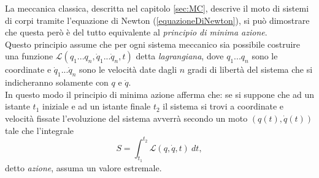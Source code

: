 La meccanica classica, descritta nel capitolo \ref{sec:MC}, descrive il moto di sistemi di corpi tramite l'equazione di Newton (\ref{equazioneDiNewton}), si può dimostrare che questa però è del tutto equivalente al \emph{principio di minima azione}.\\ Questo principio assume che per ogni sistema meccanico sia possibile costruire una funzione $\mathcal{L}(q_1...q_n,\dot{q}_1...\dot{q}_n,t)$ detta \emph{lagrangiana}, dove $q_1...q_n$ sono le coordinate e $\dot{q}_1...\dot{q}_n$ sono le velocità date dagli $n$ gradi di libertà del sistema che si indicheranno solamente con $q$ e $\dot{q}$.\\ In questo modo il principio di minima azione afferma che: se si suppone che ad un istante $t_1$ iniziale e ad un istante finale $t_2$ il sistema si trovi a coordinate e velocità fissate l'evoluzione del sistema avverrà secondo un moto $(q(t),\dot{q}(t))$ tale che l'integrale 
\begin{equation}
    \label{Azione}
    S=\int_{t_1}^{t_2} \mathcal{L}(q,\dot{q},t)\ dt,
\end{equation}
detto \emph{azione}, assuma un valore estremale.\\

